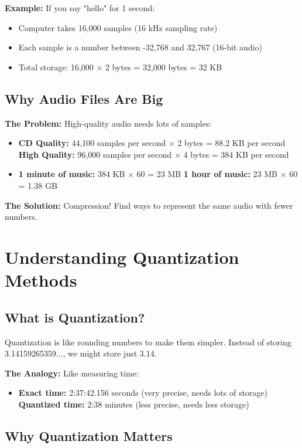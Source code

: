 \documentclass[12pt]{article}
\begin{document}
\textbf{Example:} If you say "hello" for 1 second:
\begin{itemize}
    \item Computer takes 16,000 samples (16 kHz sampling rate)
    \item Each sample is a number between -32,768 and 32,767 (16-bit audio)
    \item Total storage: 16,000 × 2 bytes = 32,000 bytes = 32 KB
\end{itemize}

\subsection{Why Audio Files Are Big}

\textbf{The Problem:} High-quality audio needs lots of samples:
\begin{itemize}
    \item \textbf{CD Quality:} 44,100 samples per second × 2 bytes = 88.2 KB per second
    \textbf{High Quality:} 96,000 samples per second × 4 bytes = 384 KB per second
    \item \textbf{1 minute of music:} 384 KB × 60 = 23 MB
    \textbf{1 hour of music:} 23 MB × 60 = 1.38 GB
\end{itemize}

\textbf{The Solution:} Compression! Find ways to represent the same audio with fewer numbers.

\section{Understanding Quantization Methods}

\subsection{What is Quantization?}

Quantization is like rounding numbers to make them simpler. Instead of storing 3.14159265359..., we might store just 3.14.

\textbf{The Analogy:} Like measuring time:
\begin{itemize}
    \item \textbf{Exact time:} 2:37:42.156 seconds (very precise, needs lots of storage)
    \textbf{Quantized time:} 2:38 minutes (less precise, needs less storage)
\end{itemize}

\subsection{Why Quantization Matters}
\end{document}
